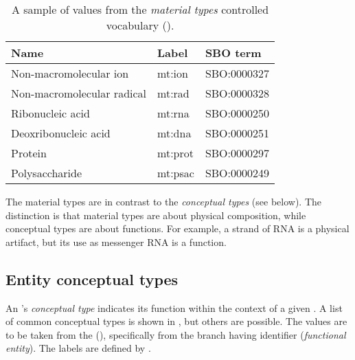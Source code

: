 \begin{table}[ht]
  \centering
  \begin{tabular}{l>{\ttfamily}ll}
    \toprule
    \textbf{Name}              & \textbf{\rmfamily Label} & \textbf{SBO term} \\
    \midrule
    Non-macromolecular ion     & mt:ion  & SBO:0000327\\
    Non-macromolecular radical & mt:rad  & SBO:0000328\\
    Ribonucleic acid           & mt:rna  & SBO:0000250\\
    Deoxribonucleic acid       & mt:dna  & SBO:0000251\\
    Protein                    & mt:prot & SBO:0000297\\
    Polysaccharide             & mt:psac & SBO:0000249\\
    \bottomrule
  \end{tabular}
  \caption{A sample of values from the \emph{material types} controlled
    vocabulary ().}
  \label{tab:material-types-cv}
\end{table}

The material types are in contrast to the \emph{conceptual types} (see below).  The distinction is that material types are about physical composition, while conceptual types are about functions.  For example, a strand of RNA is a physical artifact, but its use as messenger RNA is a function.

\subsection{Entity conceptual types}
\label{sec:conceptual-types-cv}

An 's \emph{conceptual type} indicates its function within the context of a given \ERm.  A list of common conceptual types is shown in , but others are possible.  The values are to be taken from the \sbo (\sbourl), specifically from the branch having identifier  (\emph{functional entity}).  The labels are defined by \SBGNERLone.

